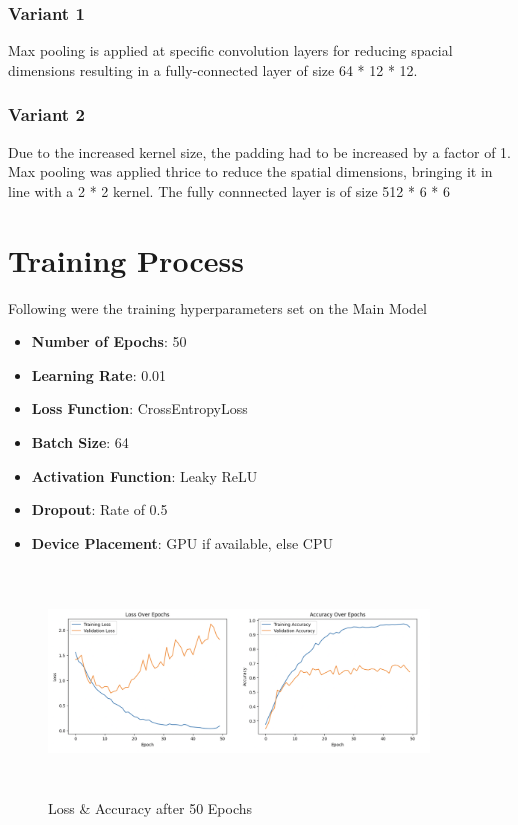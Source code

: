   \subsubsection*{Variant 1}
  \noindent Max pooling is applied at specific convolution layers for reducing spacial dimensions resulting in a fully-connected layer of size 64 * 12 * 12.\\
  \subsubsection*{Variant 2}    
    \noindent Due to the increased kernel size, the padding had to be increased by a factor of 1. Max pooling was applied thrice to reduce the spatial dimensions, bringing it in line with a 2 * 2 kernel. The fully connnected layer is of size 512 * 6 * 6\\

\section{Training Process}
Following were the training hyperparameters set on the Main Model
\begin{itemize}
    \item \textbf{Number of Epochs}: 50
    \item \textbf{Learning Rate}: 0.01
    \item \textbf{Loss Function}: CrossEntropyLoss
    \item \textbf{Batch Size}: 64
    \item \textbf{Activation Function}: Leaky ReLU
    \item \textbf{Dropout}: Rate of 0.5
    \item \textbf{Device Placement}: GPU if available, else CPU
  \end{itemize}

  \begin{figure}[h!]
    \centering
    \includegraphics[width=0.9\textwidth, height=6cm]{resources/loss-acc-lg.png}
    \caption{Loss \& Accuracy after 50 Epochs}
  \end{figure}

